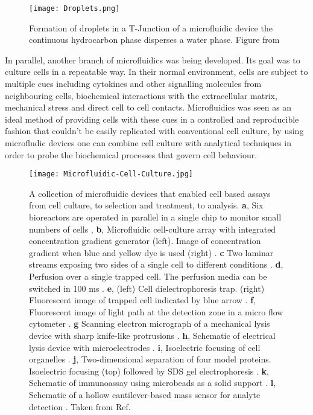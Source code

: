 \begin{figure}
  \texttt{[image: Droplets.png]}
  \caption{Formation of droplets in a T-Junction of a microfluidic device the continuous hydrocarbon
  phase disperses a water phase. Figure from \citep{RN104}}
  \label{fig:IntroDrops}
\end{figure}

In parallel, another branch of microfluidics was being developed. Its goal was to
culture cells in a repeatable way. In their normal environment, cells are subject to multiple
cues including cytokines and other signalling molecules from neighbouring cells, biochemical
interactions with the extracellular matrix, mechanical stress and direct cell to cell contacts.
Microfluidics was seen as an ideal method of providing cells with these cues in a controlled and reproducible fashion that couldn't be easily
replicated with conventional cell culture, by using microfludic devices one can combine
cell culture with analytical techniques in order to probe the biochemical processes that
govern cell behaviour.

\begin{figure}
  \begin{center}
  \texttt{[image: Microfluidic-Cell-Culture.jpg]}
  \end{center}
  \caption{A collection of microfluidic devices that enabled cell based assays from cell culture, to selection and treatment,
  to analysis. \textbf{a}, Six bioreactors are operated in parallel in a single chip to monitor small numbers of cells \citep{balagadde2005long},
  \textbf{b}, Microfluidic cell-culture array with integrated concentration gradient generator (left). Image of concentration
  gradient when blue and yellow dye is used (right) \citep{RN41}. \textbf{c} Two laminar streams exposing two sides of a single cell to different
  conditions \citep{takayama2001laminar}.
  \textbf{d}, Perfusion over a single trapped cell. The perfusion media can be switched in 100 ms \citep{wheeler2003microfluidic}. \textbf{e}, (left) Cell dielectrophoresis
  trap. (right) Fluorescent image of trapped cell indicated by blue arrow \citep{Voldman:2002gf}. \textbf{f}, Fluorescent image of light path at the detection
  zone in a micro flow cytometer \citep{wang2004measurements}. \textbf{g} Scanning electron micrograph of a mechanical lysis device with sharp knife-like protrusions \citep{di2003reagentless}.
  \textbf{h}, Schematic of electrical lysis device with microelectrodes \citep{lee1999micro}. \textbf{i}, Isoelectric focusing of cell organelles \citep{lu2004microfabricated}.
  \textbf{j}, Two-dimensional separation of four model proteins. Isoelectric focusing (top) followed by SDS gel electrophoresis \citep{li2004integration}.
  \textbf{k}, Schematic of immunoassay using microbeads as a solid support \citep{sato2002microchip}. \textbf{l}, Schematic of a hollow cantilever-based mass sensor
  for analyte detection \citep{burg2003suspended}. Taken from Ref.\citep{el2006cells}}
  \label{fig:CellCulture}
\end{figure}

